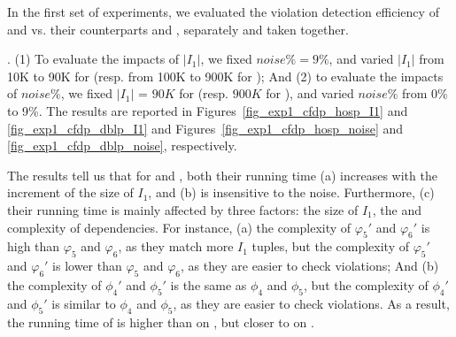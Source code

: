 In the first set of experiments, we evaluated the violation detection efficiency of  \pCFDs and \pCINDs vs. their counterparts \CFDs and \CINDs, separately and taken together.

. 
(1) To evaluate the impacts of $|I_1|$, we fixed $noise\% = 9\%$, and varied $|I_1|$ from 10K to 90K for \hosp (resp. from 100K to 900K for \dblp); And (2) to evaluate the impacts of $noise\%$, we fixed $|I_1|$ = $90K$ for \hosp (resp. $900K$ for \dblp), and varied $noise\%$ from 0\% to 9\%.
%
The results are reported in Figures~\ref{fig_exp1_cfdp_hosp_I1} and \ref{fig_exp1_cfdp_dblp_I1} and Figures~\ref{fig_exp1_cfdp_hosp_noise} and \ref{fig_exp1_cfdp_dblp_noise}, respectively.


The results tell us that for \CFDs and \pCFDs, both their running time (a) increases with the increment of the size of $I_1$, and (b) is insensitive to the noise. Furthermore, (c) their running time is mainly affected by three factors: the size of $I_1$, the \LHS and \RHS complexity of dependencies.
For instance, (a) the \LHS complexity of \CFDs $\varphi_5'$ and $\varphi_6'$ is high than \pCFDs $\varphi_5$ and $\varphi_6$, as they match more $I_1$ tuples, but the \RHS complexity of \CFDs $\varphi_5'$ and $\varphi_6'$ is lower than \pCFDs $\varphi_5$ and $\varphi_6$, as they are easier to check violations; And
(b) the \LHS complexity of \CFDs $\phi_4'$ and $\phi_5'$ is the same as  \pCFDs $\phi_4$ and $\phi_5$, but
 the \RHS complexity of \CFDs $\phi_4'$ and $\phi_5'$ is similar to \pCFDs $\phi_4$ and $\phi_5$, as they are easier to check violations.
As a result, the running time of \CFDs is higher than \pCFDs on \hosp, but closer to \pCFDs on \dblp. 
 
